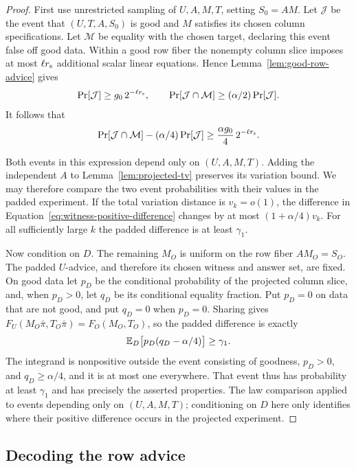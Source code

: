 \begin{proof}
First use unrestricted sampling of $U,A,M,T$, setting $S_0=AM$.  Let
$\mathcal J$ be the event that $(U,T,A,S_0)$ is good and $M$ satisfies
its chosen column specifications.  Let $\mathcal M$ be equality with
the chosen target, declaring this event false off good data.  Within a
good row fiber the nonempty column slice
imposes at most $\ell r_{\rm s}$ additional scalar linear equations.
Hence Lemma~\ref{lem:good-row-advice} gives
\[
 \Pr[\mathcal J]\ge g_0\,2^{-\ell r_{\rm s}},
 \qquad
 \Pr[\mathcal J\cap\mathcal M]\ge(\alpha/2)\Pr[\mathcal J].
\]
It follows that
\begin{equation}
 \Pr[\mathcal J\cap\mathcal M]
       -(\alpha/4)\Pr[\mathcal J]
 \ge\frac{\alpha g_0}{4}\,2^{-\ell r_{\rm s}}.
 \label{eq:witness-positive-difference}
\end{equation}

Both events in this expression depend only on $(U,A,M,T)$.  Adding the
independent $A$ to Lemma~\ref{lem:projected-tv} preserves its variation
bound.  We may therefore compare the two event probabilities with their
values in the padded experiment.  If the total variation distance is
$v_k=o(1)$, the difference in Equation~\eqref{eq:witness-positive-difference}
changes by at most $(1+\alpha/4)v_k$.  For all sufficiently large $k$
the padded difference is at least $\gamma_1$.

Now condition on $D$.  The remaining $M_O$ is uniform on the row fiber
$AM_O=S_O$.  The padded
$U$-advice, and therefore its chosen witness and answer set, are fixed.
On good data let $p_D$ be the conditional probability of the projected
column slice, and, when $p_D>0$, let $q_D$ be its conditional equality
fraction.  Put $p_D=0$ on data that are not good, and put $q_D=0$ when
$p_D=0$.  Sharing gives
$F_U(M_O\bar\pi,T_O\bar\pi)=F_O(M_O,T_O)$, so the padded difference
is exactly
\[
 \mathbb E_D\bigl[p_D(q_D-\alpha/4)\bigr]\ge\gamma_1.
\]
The integrand is nonpositive outside the event consisting of goodness,
$p_D>0$, and $q_D\ge\alpha/4$, and it is at most one everywhere.
That event thus has probability at least $\gamma_1$ and has precisely the
asserted properties.  The law comparison applied to events depending only
on $(U,A,M,T)$; conditioning on $D$ here only identifies where their
positive difference occurs in the projected experiment.
\end{proof}

\subsection{Decoding the row advice}

